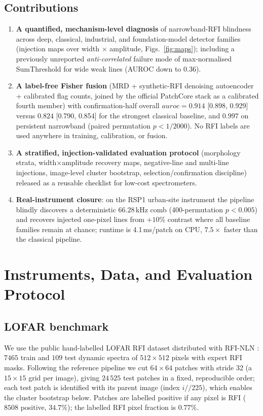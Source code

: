 \documentclass[journal]{IEEEtran}
\begin{document}
\subsection*{Contributions}
\begin{enumerate}
\item \textbf{A quantified, mechanism-level diagnosis} of narrowband-RFI
blindness across deep, classical, industrial, and foundation-model detector
families
(injection maps over width $\times$ amplitude, Figs.~\ref{fig:maps});
including a previously unreported \emph{anti-correlated} failure mode of
max-normalised SumThreshold for wide weak lines (AUROC down to $0.36$).
\item \textbf{A label-free Fisher fusion} (MRD + synthetic-RFI denoising
autoencoder + calibrated flag counts, joined by the official PatchCore
stack as a calibrated fourth member) with confirmation-half overall
$auroc=0.914$ [0.898, 0.929] versus $0.824$ [0.790, 0.854] for the strongest
classical baseline, and $0.997$ on persistent narrowband
(paired permutation $p<1/2000$).  No RFI labels are used anywhere in
training, calibration, or fusion.
\item \textbf{A stratified, injection-validated evaluation protocol}
(morphology strata, width$\times$amplitude recovery maps, negative-line and
multi-line injections, image-level cluster bootstrap, selection/confirmation
discipline) released as a reusable checklist for low-cost spectrometers.
\item \textbf{Real-instrument closure}: on the RSP1 urban-site instrument the
pipeline blindly discovers a deterministic $66.28$\,kHz comb
(400-permutation $p<0.005$) and recovers injected one-pixel lines from
$+10\%$ contrast where all baseline families remain at chance; runtime is
4.1\,ms/patch on CPU, $7.5\times$ faster than the classical pipeline.
\end{enumerate}

\section{Instruments, Data, and Evaluation Protocol}
\subsection{LOFAR benchmark}
We use the public hand-labelled LOFAR RFI dataset distributed with
RFI-NLN \cite{mesarcik2022}: $7465$ train and $109$ test dynamic spectra of
$512\times512$ pixels with expert RFI masks.  Following the reference
pipeline we cut $64\times64$ patches with stride 32 (a $15\times15$ grid per
image), giving $24\,525$ test patches in a fixed, reproducible order; each
test patch is identified with its parent image (index $i//225$), which
enables the cluster bootstrap below.  Patches are labelled positive if any
pixel is RFI ($8508$ positive, $34.7\%$); the labelled RFI pixel fraction is
$0.77\%$.
\end{document}
